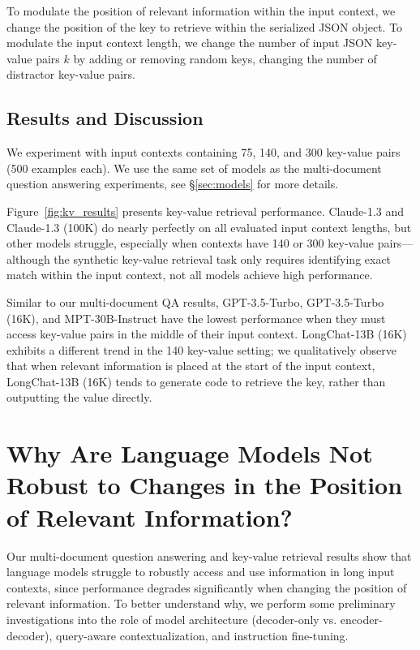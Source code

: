 To modulate the position of relevant information within the input context, we change the position of the key to retrieve within the serialized JSON object. To modulate the input context length, we change the number of input JSON key-value pairs $k$ by adding or removing random keys, changing the number of distractor key-value pairs.

\subsection{Results and Discussion}\label{sec:kv_results}

We experiment with input contexts containing 75, 140, and 300 key-value pairs (500 examples each). We use the same set of models as the multi-document question answering experiments, see \S\ref{sec:models} for more details.

Figure~\ref{fig:kv_results} presents key-value retrieval performance. Claude-1.3 and Claude-1.3 (100K) do nearly perfectly on all evaluated input context lengths, but other models struggle, especially when contexts have 140 or 300 key-value pairs---although the synthetic key-value retrieval task only requires identifying exact match within the input context, not all models achieve high performance.

Similar to our multi-document QA results, GPT-3.5-Turbo, GPT-3.5-Turbo (16K), and MPT-30B-Instruct have the lowest performance when they must access key-value pairs in the middle of their input context. LongChat-13B (16K) exhibits a different trend in the 140 key-value setting; we qualitatively observe that when relevant information is placed at the start of the input context, LongChat-13B (16K) tends to generate code to retrieve the key, rather than outputting the value directly.

\section{Why Are Language Models Not Robust to Changes in the Position of Relevant Information?}\label{sec:why_u_shape}

Our multi-document question answering and key-value retrieval results show that language models struggle to robustly access and use information in long input contexts, since performance degrades significantly when changing the position of relevant information. To better understand why, we perform some preliminary investigations into the role of model architecture (decoder-only vs. encoder-decoder), query-aware contextualization, and instruction fine-tuning.

